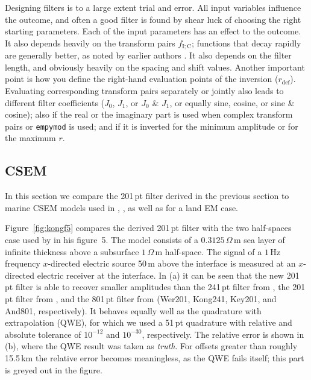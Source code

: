\documentclass[paper,twocolumn,twoside]{geophysics}
\newcommand{\mr}[1]{\mathrm{#1}}
\begin{document}
Designing filters is to a large extent trial and error. All input variables
influence the outcome, and often  a good filter is found by shear luck of
choosing the right starting parameters. Each of the input parameters has an
effect to the outcome. It also depends heavily on the transform pairs
$f_\mr{I;C}$; functions that decay rapidly are generally better, as noted by
earlier authors \citep[e.g.][]{USGS.75.Anderson}. It also depends on the filter
length, and obviously heavily on the spacing and shift values. Another
important point is how you define the right-hand evaluation points of the
inversion ($r_\mr{def}$). Evaluating corresponding transform pairs separately
or jointly also leads to different filter coefficients ($J_0$, $J_1$, or $J_0$
\& $J_1$, or equally sine, cosine, or sine \& cosine); also if the real or the
imaginary part is used when complex transform pairs or \texttt{empymod} is
used; and if it is inverted for the minimum amplitude or for the maximum $r$.

\subsection{CSEM}
In this section we compare the 201\,pt filter derived in the previous section
to marine CSEM models used in \cite{GP.07.Kong}, \cite{GEO.12.Key}, as well as
for a land EM case.

Figure~\ref{fig:kongf5} compares the derived 201\,pt filter with the two
half-spaces case used by \cite{GP.07.Kong} in his figure~5. The model consists
of a $0.3125\,\Omega\,$m sea layer of infinite thickness above a subsurface
$1\,\Omega\,$m half-space. The signal of a $1\,$Hz frequency $x$-directed
electric source 50\,m above the interface is measured at an $x$-directed
electric receiver at the interface.
%
%
In (a) it can be seen that the new 201\,pt filter is able to recover smaller
amplitudes than the 241\,pt filter from \cite{GP.07.Kong}, the 201\,pt filter
from \cite{GEO.12.Key}, and the 801\,pt filter from \cite{TMS.82.Anderson}
(Wer201, Kong241, Key201, and And801, respectively). It behaves equally well as
the quadrature with extrapolation (QWE), for which we used a 51\,pt quadrature
with relative and absolute tolerance of $10^{-12}$ and $10^{-30}$,
respectively. The relative error is shown in (b), where the QWE result was
taken as \emph{truth}. For offsets greater than roughly 15.5\,km the relative
error becomes meaningless, as the QWE fails itself; this part is greyed out in
the figure.
\end{document}
